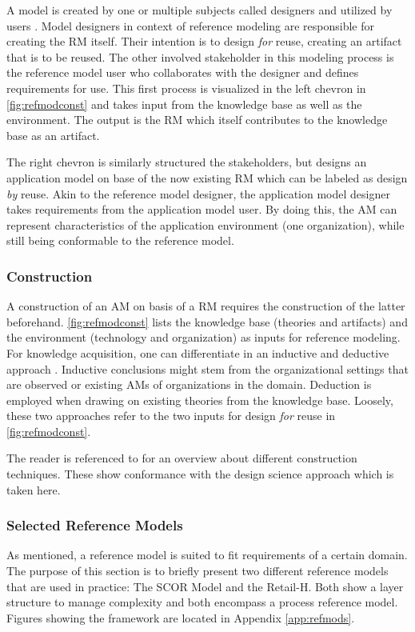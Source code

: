 		A model is created by one or multiple subjects called designers and utilized by users \citep{becker2004handelsinformationssysteme}. Model designers in context of reference modeling are responsible for creating the \acrshort{RM} itself. Their intention is to design \textit{for} reuse, \ie creating an artifact that is to be reused. The other involved stakeholder in this modeling process is the reference model user who collaborates with the designer and defines requirements for use. This first process is visualized in the left chevron in \Fig \ref{fig:refmodconst} and takes input from the knowledge base as well as the environment. The output is the  \acrshort{RM} which itself contributes to the knowledge base as an artifact. 
		
		The right chevron is similarly structured \wrt the stakeholders, but designs an application model on base of the now existing \acrshort{RM} which can be labeled as design \textit{by} reuse. Akin to the reference model designer, the application model designer takes requirements from the application model user. By doing this, the  \acrshort{AM} can represent characteristics of the application environment (\ie one organization), while still being conformable to the reference model. 
		
		\subsubsection{Construction}
		A construction of an \acrshort{AM} on basis of a \acrshort{RM} requires the construction of the latter beforehand. 
		\Fig \ref{fig:refmodconst} lists the knowledge base (theories and artifacts) and the environment (technology and organization) as inputs for reference modeling. For knowledge acquisition, one can differentiate in an inductive and deductive approach \citep{thomas2006mang}. Inductive conclusions  might stem from the organizational settings that are observed or existing \acrshort{AM}s of organizations in the domain. Deduction is employed when drawing on existing theories from the knowledge base. Loosely, these two approaches refer to the two inputs for design \textit{for} reuse in \Fig \ref{fig:refmodconst}. 
		
		The reader is referenced to \cite{Fettke2014meth} for an overview about different construction techniques. These show conformance with the design science approach \citep[]{Puster2015} which is taken here. 
		
		
		\subsubsection{Selected Reference Models}
		\label{mod:scor}
		As mentioned, a reference model is suited to fit requirements of a certain domain. The purpose of this section is to briefly present two different reference models that are used in practice: The \acrfull{SCOR} Model and the Retail-H. Both show a layer structure to manage complexity and both encompass a process reference model. Figures showing the framework are located in Appendix \ref{app:refmods}.
		
